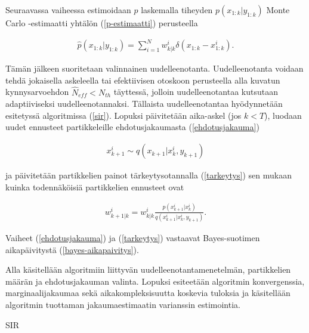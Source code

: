\documentclass[
  12pt,
  a4paper, twoside]{book}
\begin{document}
\noindent Seuraavassa vaiheessa estimoidaan \(p\) laskemalla tiheyden \(p(x_{1:k}|y_{1:k})\) Monte Carlo -estimaatti yhtälön (\ref{p-estimaatti}) perusteella

\begin{align}\label{p-estimaatti}
\hat{p}(x_{1:k}|y_{1:k})=\sum_{i=1}^{N}w_{k|k}^i \delta(x_{1:k}-x_{1:k}^i).
\end{align}

Tämän jälkeen suoritetaan valinnainen uudelleenotanta. Uudelleenotanta voidaan tehdä jokaisella askeleella tai efektiivisen otoskoon perusteella alla kuvatun kynnysarvoehdon \(\hat{N}_{eff}< N_{th}\) täyttessä, jolloin uudelleenotantaa kutsutaan adaptiiviseksi uudelleenotannaksi. Tällaista uudelleenotantaa hyödynnetään esitetyssä algoritmissa (\ref{sir}). Lopuksi päivitetään aika-askel (jos \(k < T\)), luodaan uudet ennusteet partikkeleille ehdotusjakaumasta (\ref{ehdotusjakauma})

\begin{align}\label{ehdotusjakauma}
x_{k+1}^i\sim q(x_{k+1}|x_k^i,y_{k+1})
\end{align}

\noindent ja päivitetään partikkelien painot tärkeytysotannalla (\ref{tarkeytys}) sen mukaan kuinka todennäköisiä partikkelien ennusteet ovat

\begin{align}\label{tarkeytys} w_{k+1|k}^i=w_{k|k}^i\frac{p(x_{k+1}^i|x_k^i)}{q(x_{k+1}^i|x_k^i,y_{k+1})}.
\end{align}

\noindent Vaiheet (\ref{ehdotusjakauma}) ja (\ref{tarkeytys}) vastaavat Bayes-suotimen aikapäivitystä (\ref{bayes-aikapaivitys}).

Alla käsitellään algoritmiin liittyvän uudelleenotantamenetelmän, partikkelien määrän ja ehdotusjakauman valinta. Lopuksi esiteetään algoritmin konvergenssia, marginaalijakaumaa sekä aikakompleksisuutta koskevia tuloksia ja käsitellään algoritmin tuottaman jakaumaestimaatin varianssin estimointia.

\begin{algorithm}[H]
\label{sir}
\DontPrintSemicolon
\SetAlgoShortEnd
{}
\caption{SIR}
\end{algorithm}
\end{document}
